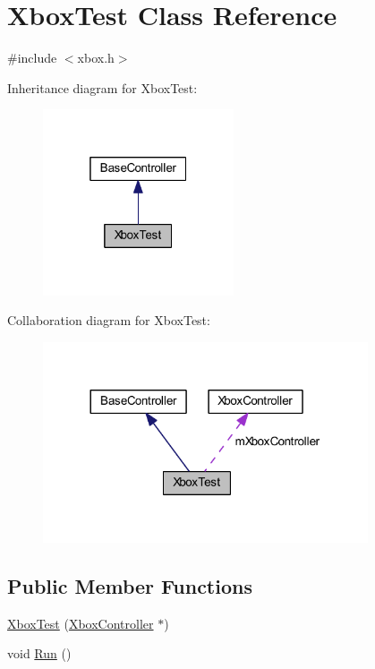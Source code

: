\hypertarget{class_xbox_test}{\section{\-Xbox\-Test \-Class \-Reference}
\label{class_xbox_test}
}


{\ttfamily \#include $<$xbox.\-h$>$}



\-Inheritance diagram for \-Xbox\-Test\-:\nopagebreak
\begin{figure}[H]
\begin{center}
\leavevmode
\includegraphics[width=160pt]{class_xbox_test__inherit__graph}
\end{center}
\end{figure}


\-Collaboration diagram for \-Xbox\-Test\-:\nopagebreak
\begin{figure}[H]
\begin{center}
\leavevmode
\includegraphics[width=272pt]{class_xbox_test__coll__graph}
\end{center}
\end{figure}
\subsection*{\-Public \-Member \-Functions}
\begin{DoxyCompactItemize}
\item 
\hyperlink{class_xbox_test_ae266c510190958cff69d9bbf9156aa31}{\-Xbox\-Test} (\hyperlink{class_xbox_controller}{\-Xbox\-Controller} $\ast$)
\item 
void \hyperlink{class_xbox_test_a366167361a23d736dadecb00f7c34dc8}{\-Run} ()
\end{DoxyCompactItemize}
